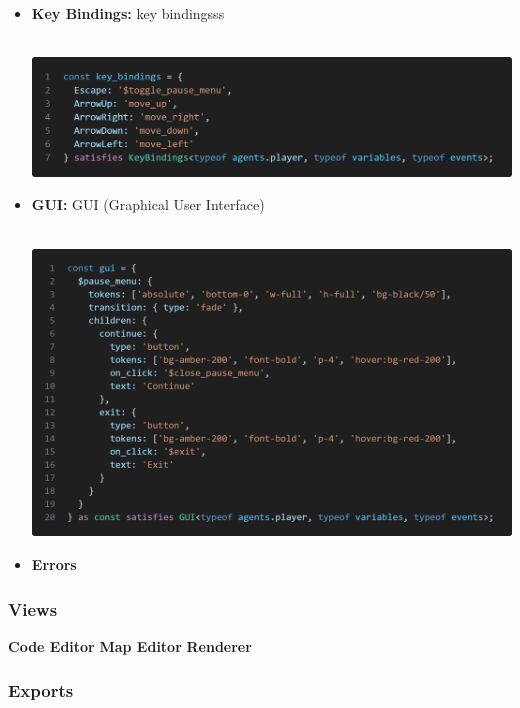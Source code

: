 \documentclass{article}
\begin{document}
\begin{itemize}
    \item \textbf{Key Bindings:} key bindingsss \\\\
    \begin{minipage}{\linewidth}
        \centering
        \includegraphics[width=1\textwidth]{key bindings.png}
        \label{fig:figure6}
    \end{minipage}
    
    \item \textbf{GUI:} GUI (Graphical User Interface)  \\\\
    \begin{minipage}{\linewidth}
        \centering
        \includegraphics[width=1\textwidth]{gui.png}
        \label{fig:figure6}
    \end{minipage}
    
    \item \textbf{Errors}
\end{itemize}
\subsubsection{Views}
\textbf{Code Editor}
\textbf{Map Editor}
\textbf{Renderer}
\subsubsection{Exports}
\end{document}
